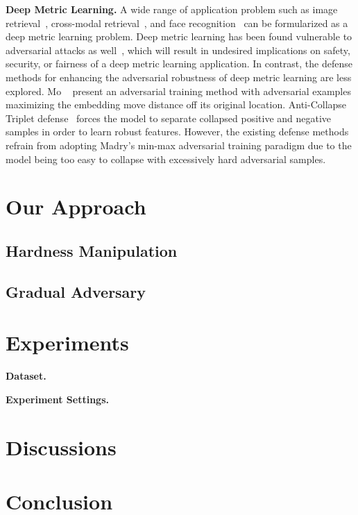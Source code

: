 \documentclass[10pt,twocolumn,letterpaper]{article}
\begin{document}
\textbf{Deep Metric Learning.}
%
A wide range of application problem such as image retrieval~\cite{imagesim2},
cross-modal retrieval~\cite{ladderloss}, and face recognition~\cite{facenet}
can be formularized as a deep metric learning problem.
%
Deep metric learning has been found vulnerable to adversarial attacks as
well~\cite{advrank,advorder}, which will result in undesired
implications on safety, security, or fairness of a deep metric learning
application.
%
In contrast, the defense methods for enhancing the adversarial robustness of deep
metric learning are less explored.
%
Mo \etal~\cite{advrank} present an adversarial training method with adversarial
examples maximizing the embedding move distance off its original location.
%
Anti-Collapse Triplet defense~\cite{robrank} forces the model
to separate collapsed positive and negative samples in order to learn
robust features.
%
However, the existing defense methods refrain from adopting Madry's min-max
adversarial training paradigm due to the model being too easy to collapse
with excessively hard adversarial samples.


\section{Our Approach}
\label{sec:3}

\subsection{Hardness Manipulation}

\subsection{Gradual Adversary}

\section{Experiments}
\label{sec:4}

\textbf{Dataset.}

\textbf{Experiment Settings.}

\section{Discussions}
\label{sec:5}



\section{Conclusion}
\label{sec:6}

\cite{Authors14}

{\small


}


\end{document}
